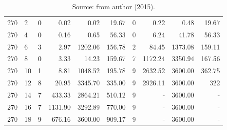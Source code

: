 \begin{appendices}
\begin{table*}[h]
\begin{center}
\begin{tabular} {l l | r r r r | r r r r}
270 & 2                                &  0              &  0.02         &  0.02          &  19.67      &  0          &  0.22         &  0.48       &  19.67        \\ 
270 & 4                                &  0              &  0.16         &  0.65          &  56.33      &  0          &  6.24         &  41.78      &  56.33        \\ 
270 & 6                                &  3              &  2.97         &  1202.06       &  156.78     &  2          &  84.45        &  1373.08    &  159.11       \\ 
270 & 8                                &  0              &  3.33         &  14.23         &  159.67     &  7          &  1172.24      &  3350.94    &  167.56       \\ 
270 & 10                               &  1              &  8.81         &  1048.52       &  195.78     &  9          &  2632.52      &  3600.00    &  362.75       \\ 
270 & 12                               &  8              &  20.95        &  3345.70       &  335.00     &  9          &  2926.11      &  3600.00    &  322          \\ 
270 & 14                               &  7              &  433.33       &  2864.21       &  510.12     &  9          &  -            &  3600.00    &  -            \\ 
270 & 16                               &  7              &  1131.90      &  3292.89       &  770.00     &  9          &  -            &  3600.00    &  -            \\ 
270 & 18                               &  9              &  676.16       &  3600.00       &  909.17     &  9          &  -            &  3600.00    &  -            \\ 
\hline
\end{tabular}\caption*{Source: from author (2015).}
\end{center}
\end{table*}

\end{appendices}
